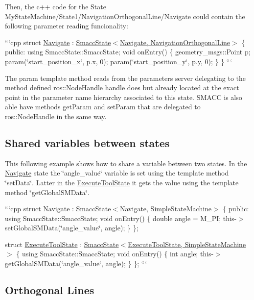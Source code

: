 Then, the c++ code for the State My\-State\-Machine/\-State1/\-Navigation\-Orthogonal\-Line/\-Navigate could contain the following parameter reading funcionality\-:

```cpp struct \hyperlink{structNavigate}{Navigate} \-: \hyperlink{classsmacc_1_1SmaccState}{Smacc\-State$<$\-Navigate, Navigation\-Orthogonal\-Line$>$} \{ public\-: using Smacc\-State\-::\-Smacc\-State; void on\-Entry() \{ geometry\-\_\-msgs\-::\-Point p; param(\char`\"{}start\-\_\-position\-\_\-x\char`\"{}, p.\-x, 0); param(\char`\"{}start\-\_\-position\-\_\-y\char`\"{}, p.\-y, 0); \} \} ```

The param template method reads from the parameters server delegating to the method defined ros\-::\-Node\-Handle handle does but already located at the exact point in the parameter name hierarchy associated to this state. S\-M\-A\-C\-C is also able have methods get\-Param and set\-Param that are delegated to ros\-::\-Node\-Handle in the same way.

\subsection*{Shared variables between states}

This following example shows how to share a variable between two states. In the \hyperlink{structNavigate}{Navigate} state the \char`\"{}angle\-\_\-value\char`\"{} variable is set using the template method \char`\"{}set\-Data\char`\"{}. Latter in the \hyperlink{structExecuteToolState}{Execute\-Tool\-State} it gets the value using the template method \char`\"{}get\-Global\-S\-M\-Data\char`\"{}.

```cpp struct \hyperlink{structNavigate}{Navigate} \-: \hyperlink{classsmacc_1_1SmaccState}{Smacc\-State$<$\-Navigate, Simple\-State\-Machine$>$} \{ public\-: using Smacc\-State\-::\-Smacc\-State; void on\-Entry() \{ double angle = M\-\_\-\-P\-I; this-\/$>$set\-Global\-S\-M\-Data(\char`\"{}angle\-\_\-value\char`\"{}, angle); \} \};

struct \hyperlink{structExecuteToolState}{Execute\-Tool\-State} \-: \hyperlink{classsmacc_1_1SmaccState}{Smacc\-State$<$\-Execute\-Tool\-State, Simple\-State\-Machine$>$} \{ using Smacc\-State\-::\-Smacc\-State; void on\-Entry() \{ int angle; this-\/$>$get\-Global\-S\-M\-Data(\char`\"{}angle\-\_\-value\char`\"{}, angle); \} \}; ```

\subsection*{Orthogonal Lines}

